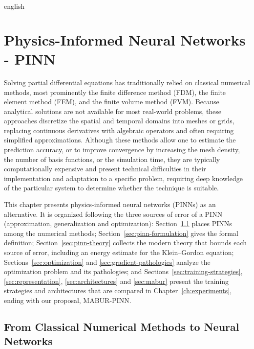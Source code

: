 \documentclass[../0000.tex]{subfiles}
\begin{document}

\begin{hyphenrules}{english}

\chapter{Physics-Informed Neural Networks - PINN}\label{ch:pinns}

Solving partial differential equations has traditionally relied on classical numerical methods, most
prominently the finite difference method (FDM), the finite element method (FEM), and the finite volume
method (FVM). Because analytical solutions are not available for most real-world problems, these
approaches discretize the spatial and temporal domains into meshes or grids, replacing continuous
derivatives with algebraic operators and often requiring simplified approximations. Although these
methods allow one to estimate the prediction accuracy, or to improve convergence by increasing the
mesh density, the number of basis functions, or the simulation time, they are typically computationally
expensive and present technical difficulties in their implementation and adaptation to a specific
problem, requiring deep knowledge of the particular system to determine whether the technique is
suitable.

This chapter presents physics-informed neural networks (PINNs) as an alternative. It is organized
following the three sources of error of a PINN (approximation, generalization and optimization):
Section~\ref{sec:pinn-background} places PINNs among the numerical methods; Section~\ref{sec:pinn-formulation}
gives the formal definition; Section~\ref{sec:pinn-theory} collects the modern theory that bounds each source
of error, including an energy estimate for the Klein--Gordon equation; Sections~\ref{sec:optimization} and \ref{sec:gradient-pathologies}
analyze the optimization problem and its pathologies; and
Sections~\ref{sec:training-strategies}, \ref{sec:representation}, \ref{sec:architectures} and \ref{sec:mabur} present the training
strategies and architectures that are compared in Chapter~\ref{ch:experiments}, ending with our proposal,
MABUR-PINN.

\section{From Classical Numerical Methods to Neural Networks}\label{sec:pinn-background}


\end{hyphenrules}
\end{document}
